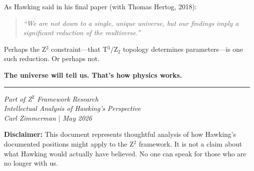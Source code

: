\documentclass[12pt,a4paper]{article}
\begin{document}
As Hawking said in his final paper (with Thomas Hertog, 2018):
\begin{quote}
\textit{``We are not down to a single, unique universe, but our findings imply a significant reduction of the multiverse.''}
\end{quote}

Perhaps the Z$^2$ constraint---that T$^3$/Z$_2$ topology determines parameters---is one such reduction. Or perhaps not.

\textbf{The universe will tell us. That's how physics works.}

\vspace{1cm}
\hrule
\vspace{0.5cm}
\textit{Part of Z$^2$ Framework Research}\\
\textit{Intellectual Analysis of Hawking's Perspective}\\
\textit{Carl Zimmerman $|$ May 2026}

\vspace{0.5cm}
\textbf{Disclaimer:} This document represents thoughtful analysis of how Hawking's documented positions might apply to the Z$^2$ framework. It is not a claim about what Hawking would actually have believed. No one can speak for those who are no longer with us.
\end{document}
